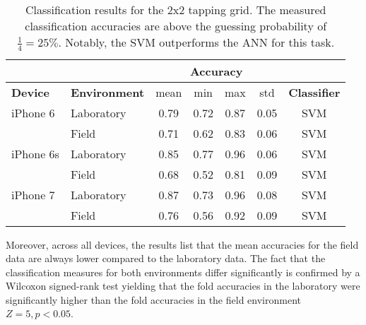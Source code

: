 \begin{table}[h!]
  \centering
  \begin{tabular}{|l|l|c|c|c|c|c|}
    \cline{3-6}
    \multicolumn{2}{c}{} & \multicolumn{4}{|c|}{\textbf{Accuracy}}  \\
    \hline
    \textbf{Device} & \textbf{Environment} & mean &   min &   max  & std &  \textbf{Classifier} \\
    \hline
    iPhone 6 & Laboratory &      0.79 &     0.72 &     0.87 &     0.05 &  SVM \\
    & Field &      0.71 &     0.62 &     0.83 &     0.06 &  SVM \\
    \hline
iPhone 6s     & Laboratory &      0.85 &     0.77 &     0.96 &     0.06 &  SVM \\
& Field &      0.68 &     0.52 &     0.81 &     0.09 &  SVM \\
    \hline
iPhone 7 & Laboratory &      0.87 &     0.73 &     0.96 &     0.08 &  SVM \\
& Field &      0.76 &     0.56 &     0.92 &     0.09 &  SVM \\
    \hline
  \end{tabular}
  \caption{Classification results for the 2x2 tapping grid. The measured classification accuracies are above the guessing probability of $\frac{1}{4} = 25\%$. Notably, the SVM outperforms the ANN for this task.}
\end{table}



Moreover, across all devices, the results list that the mean accuracies for the field data are always lower compared to the laboratory data. The fact that the classification measures for both environments differ significantly is confirmed by a Wilcoxon signed-rank test yielding that the fold accuracies in the laboratory were significantly higher than the fold accuracies in the field environment $Z = 5, p < 0.05$.

